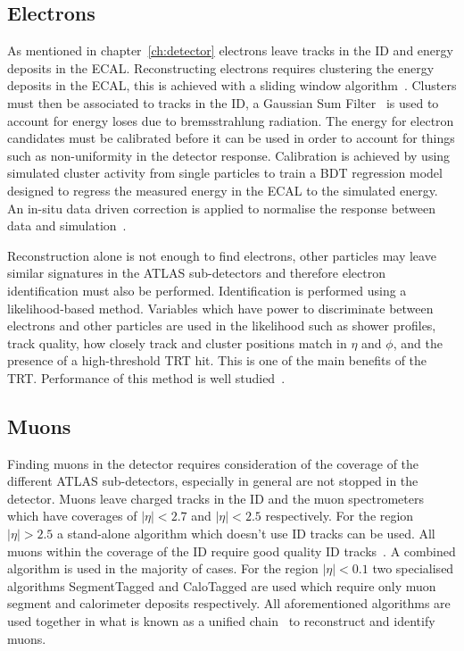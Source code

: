 \subsection{Electrons}
\label{subsec:electrons}

As mentioned in chapter~\ref{ch:detector} electrons leave tracks in the ID and
energy deposits in the ECAL. Reconstructing electrons requires clustering the
energy deposits in the ECAL, this is achieved with a sliding window
algorithm~\cite{Delmastro:1747242}. Clusters must then be associated to tracks
in the ID, a Gaussian Sum Filter~\cite{ATLAS-CONF-2012-047} is used to account
for energy loses due to bremsstrahlung radiation. The energy for electron
candidates must be calibrated before it can be used in order to account for
things such as non-uniformity in the detector response. Calibration is achieved
by using simulated cluster activity from single particles to train a BDT
regression model designed to regress the measured energy in the ECAL to the
simulated energy. An in-situ data driven correction is applied to normalise the
response between data and simulation~\cite{ATL-PHYS-PUB-2016-015}.

Reconstruction alone is not enough to find electrons, other particles may leave
similar signatures in the ATLAS sub-detectors and therefore electron
identification must also be performed. Identification is performed using a
likelihood-based method. Variables which have power to discriminate between
electrons and other particles are used in the likelihood such as shower
profiles, track quality, how closely track and cluster positions match in $\eta$
and $\phi$, and the presence of a high-threshold TRT hit. This is one of the
main benefits of the TRT. Performance of this method is well
studied~\cite{ATLAS-CONF-2016-024,EgammaEffTWiki}.

\subsection{Muons}

Finding muons in the detector requires consideration of the coverage of the
different ATLAS sub-detectors, especially in general are not stopped in the
detector. Muons leave charged tracks in the ID and the muon spectrometers which
have coverages of $\lvert \eta \rvert < 2.7$ and $\lvert \eta \rvert < 2.5$
respectively. For the region $\lvert \eta \rvert > 2.5$ a stand-alone algorithm
which doesn't use ID tracks can be used. All muons within the coverage of the ID
require good quality ID tracks~\cite{muonTWiki, MuonSelectionToolTwiki}. A
combined algorithm is used in the majority of cases. For the region $\lvert
\eta  \rvert < 0.1$ two specialised algorithms SegmentTagged and CaloTagged are
used which require only muon segment and calorimeter deposits respectively. All
aforementioned algorithms are used together in what is known as a unified
chain~\cite{Aad:2014rra,MuonChainTWiki,ATL-PHYS-PUB-2015-037} to reconstruct and
identify muons.

